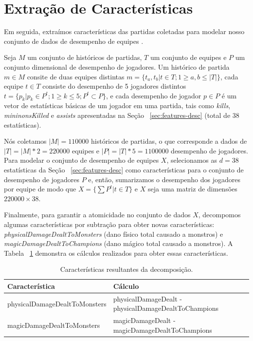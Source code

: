 \section{Extração de Características}
Em seguida, extraímos características das partidas coletadas para modelar nosso conjunto de dados de desempenho de equipes .

Seja $M$ um conjunto de históricos de partidas, $T$ um conjunto de equipes e $P$ um conjunto dimensional de desempenho de jogadores. Um histórico de partida $m \in M$ consite de duas equipes distintas $m = \{ t_a, t_b | t \in {T}; 1 \geq a, b \leq |T| \}$, cada equipe $t \in T$ consiste do desempenho de 5 jogadores distintos $t=\{p_k |  p_k \in P^t; 1 \geq k \leq 5; P^t \subset P\}$, e cada desempenho de jogador $p \in P$ é um vetor de estatísticas básicas de um jogador em uma partida, tais como \textit{kills}, \textit{mininonsKilled} e \textit{assists} apresentadas na Seção ~\ref{sec:features-desc} (total de 38 estatísticas).

Nós coletamos $|M|=110000$ históricos de partidas, o que corresponde a dados de $|T|= |M| * 2 = 220000$ equipes e $|P|=|T| * 5 = 1100000$ desempenho de jogadores. Para modelar o conjunto de desempenho de equipes $X$, selecionamos as $d=38$ estatísticas da Seção ~\ref{sec:features-desc} como características para o conjunto de desempenho de jogadores $P$ e, então, sumarizamos o desempenho dos jogadores por equipe de modo que $ X=\{ \sum P^{t} | t \in T \} $ e $X$ seja uma matriz de dimensões $ 220000 \times 38 $.

Finalmente, para garantir a atomicidade no conjunto de dados $X$, decompomos algumas características por subtração para obter novas características: \textit{physicalDamageDealtToMonsters} (dano físico total causado a monstros) e \textit{magicDamageDealtToChampions} (dano m\'agico total causado a monstros). A Tabela ~\ref{tab:decomposed-features} demonstra os cálculos realizados para obter essas características.

\begin{table}
  \scriptsize
  \caption{Características resultantes da decomposição.}
  \label{tab:decomposed-features}
  \begin{tabular}{p{}p{}}
    \toprule
    Característica & Cálculo \\
    \midrule
physicalDamageDealtToMonsters & physicalDamageDealt - physicalDamageDealtToChampions\\
magicDamageDealtToMonsters & magicDamageDealt - magicDamageDealtToChampions \\
  \bottomrule
\end{tabular}
\end{table}

